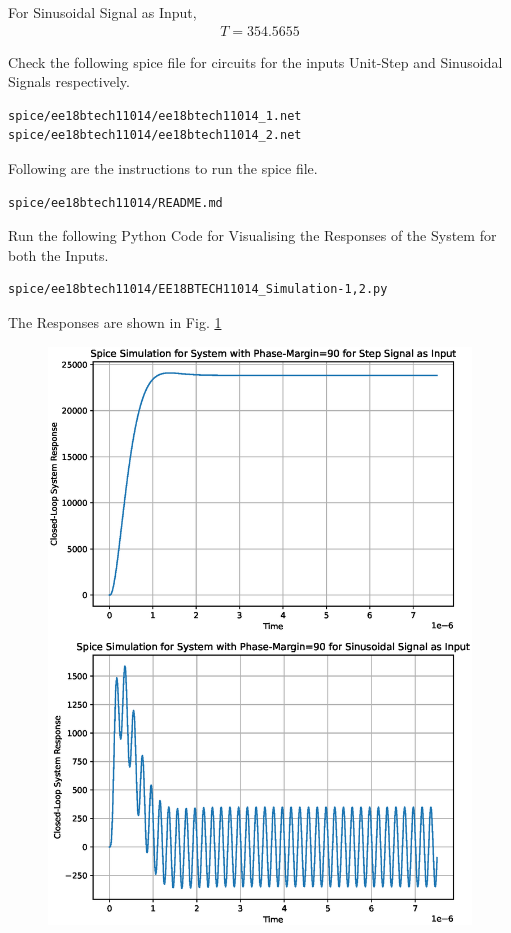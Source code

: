 \begin{enumerate}[label=\thesection.\arabic*.,ref=\thesection.\theenumi]
For Sinusoidal Signal as Input,
\begin{align}
T = 354.5655
\end{align}

Check the following spice file for circuits for the inputs Unit-Step and Sinusoidal Signals respectively.
\begin{lstlisting}
spice/ee18btech11014/ee18btech11014_1.net
spice/ee18btech11014/ee18btech11014_2.net
\end{lstlisting}

Following are the instructions to run the spice file.
\begin{lstlisting}
spice/ee18btech11014/README.md
\end{lstlisting}

Run the following Python Code for Visualising the Responses of the System for both the Inputs.
\begin{lstlisting}
spice/ee18btech11014/EE18BTECH11014_Simulation-1,2.py
\end{lstlisting}

The Responses are shown in Fig. \ref{fig:PM=90}
\begin{figure}[ht!]
	\begin{center}
		\includegraphics[width=\columnwidth]{./figs/ee18btech11014/ee18btech11014_Spice_Result_PM=90.eps}
	\end{center}
	\caption{}
	\label{fig:PM=90}
\end{figure}



\end{enumerate}
